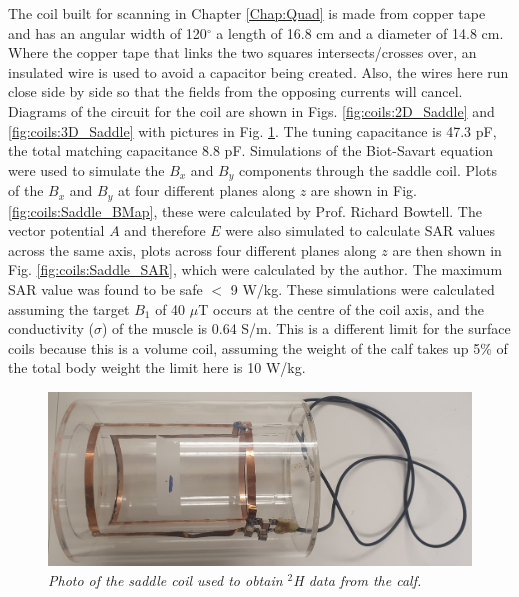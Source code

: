 The coil built for scanning in Chapter \ref{Chap:Quad} is made from copper tape and has an angular width of 120$^\circ$ a length of 16.8 cm and a diameter of 14.8 cm. Where the copper tape that links the two squares intersects/crosses over, an insulated wire is used to avoid a capacitor being created. Also, the wires here run close side by side so that the fields from the opposing currents will cancel. Diagrams of the circuit for the coil are shown in Figs. \ref{fig:coils:2D_Saddle} and \ref{fig:coils:3D_Saddle} with pictures in Fig. \ref{fig:coils:Saddle_pic}. The tuning capacitance is 47.3 pF, the total matching capacitance 8.8 pF. Simulations of the Biot-Savart equation were used to simulate the $B_x$ and $B_y$ components through the saddle coil. Plots of the $B_x$ and $B_y$ at four different planes along $z$ are shown in Fig. \ref{fig:coils:Saddle_BMap}, these were calculated by Prof. Richard Bowtell. The vector potential $A$ and therefore $E$ were also simulated to calculate \ac{SAR} values across the same axis, plots across four different planes along $z$ are then shown in Fig. \ref{fig:coils:Saddle_SAR}, which were calculated by the author. The maximum \ac{SAR} value was found to be safe $<$ 9 W/kg. These simulations were calculated assuming the target $B_1$ of 40 $\mu$T occurs at the centre of the coil axis, and the conductivity ($\sigma$) of the muscle is 0.64 S/m. This is a different limit for the surface coils because this is a volume coil, assuming the weight of the calf takes up 5\% of the total body weight the limit here is 10 W/kg.

\begin{figure}[H]
    \centering
    \includegraphics[width=1\textwidth]{Figures/Coils/Saddle_Coil.jpg}
    \caption{\textit{Photo of the saddle coil used to obtain $^2$H data from the calf.}}
    \label{fig:coils:Saddle_pic}
\end{figure}

